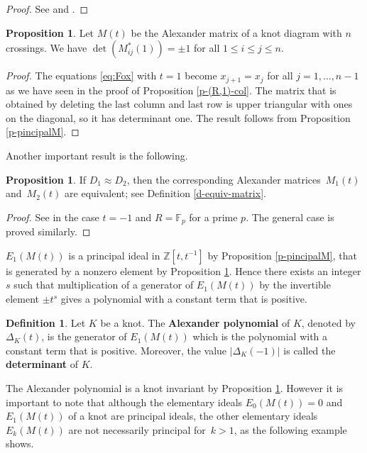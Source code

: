 \documentclass[11pt,a4paper]{article}
\theoremstyle{definition}
\newtheorem{proposition}[theorem]{Proposition}
\newtheorem{definition}[theorem]{Definition}
\newcommand{\numberset}{\mathbb}
\newcommand{\F}{\numberset{F}}
\newcommand{\Z}{\numberset{Z}}
\begin{document}
\begin{proof}
See \cite[Chapter VI (1.3)]{crowell2012introduction} and \cite[Chapter VIII (3.7)]{crowell2012introduction}.
\end{proof}


\begin{proposition}\label{p-det=pm1}
Let $M(t)$ be the Alexander matrix of a knot diagram with $n$ crossings. We have $\det (M_{ij}^*(1))=\pm1$ for all $1 \le i \le j \le n.$
\end{proposition} 
\begin{proof} 
The equations \eqref{eq:Fox} with $t=1$ become $x_{j+1}=x_j$ for all $j=1, \ldots,n-1$ as we have seen in the proof of Proposition \ref{p-(R,1)-col}. The matrix that is obtained by deleting the last column and last row is upper triangular with ones on the diagonal, so it has determinant one. The result follows from Proposition \ref{p-pincipalM}.
\end{proof}

Another important result is the following.

 
\begin{proposition}\label{p-ReidemesterM}
If $D_1 \approx D_2$, 
then the corresponding Alexander matrices~$M_1(t)$ and~$M_2(t)$ are equivalent; see Definition \ref{d-equiv-matrix}. 
\end{proposition}

\begin{proof}
See \cite[Chapter 2, Theorem 3]{livingston1993knot} in the case $t=-1$ and $R=\F_p$ for a prime $p$. The general case is proved similarly.
\end{proof}


$E_1(M(t))$ is a principal ideal in $\Z[t,t^{-1}]$ by Proposition \ref{p-pincipalM}, that is generated by a nonzero element by Proposition \ref{p-det=pm1}.
Hence there exists an integer $s$ such that multiplication of a generator of $E_1(M(t))$ by the invertible element $\pm t^s$ gives a polynomial with a constant term that is positive. 

\begin{definition}
\label{def:alex}
Let $K$ be a knot. The \textbf{Alexander polynomial} of $K$, denoted by $\Delta_K(t)$, 
is the generator of $E_1(M(t))$ which is the polynomial with a constant term that is positive. Moreover, the value $|\Delta_K(-1)|$ is called the \textbf{determinant} of $K$. 
\end{definition}

The Alexander polynomial is a knot invariant by Proposition \ref{p-ReidemesterM}. However it is important to note that although the elementary ideals $E_0(M(t))=0$ and $E_1(M(t))$ of a knot are principal ideals, the other elementary ideals $E_k(M(t))$ are not necessarily principal for~$k>1$, as the following example shows.
\end{document}
